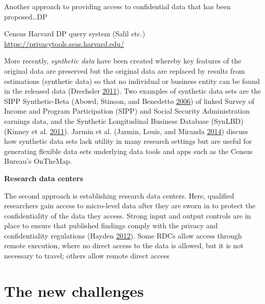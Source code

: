 \documentclass[]{krantz}
\begin{document}
Another approach to providing access to confidential data that has been
proposed\ldots{}DP

Census Harvard DP query system (Salil etc.)
\url{https://privacytools.seas.harvard.edu/}

More recently, \emph{synthetic data} have been created whereby key
features of the original data are preserved but the original data are
replaced by results from estimations (synthetic data) so that no
individual or business entity can be found in the released data
(Drechsler \protect\hyperlink{ref-drechsler2011synthetic}{2011}). Two
examples of synthetic data sets are the SIPP Synthetic-Beta (Abowd,
Stinson, and Benedetto \protect\hyperlink{ref-abowd2006final}{2006}) of
linked Survey of Income and Program Participation (SIPP) and Social
Security Administration earnings data, and the Synthetic Longitudinal
Business Database (SynLBD) (Kinney et al.
\protect\hyperlink{ref-kinney2011towards}{2011}). Jarmin et al. (Jarmin,
Louis, and Miranda \protect\hyperlink{ref-jarmin2014expanding}{2014})
discuss how synthetic data sets lack utility in many research settings
but are useful for generating flexible data sets underlying data tools
and apps such as the Census Bureau's OnTheMap.

\textbf{Research data centers}

The second approach is establishing research data centers. Here,
qualified researchers gain access to micro-level data after they are
sworn in to protect the confidentiality of the data they access. Strong
input and output controls are in place to ensure that published findings
comply with the privacy and confidentiality regulations (Hayden
\protect\hyperlink{ref-hayden2012broken}{2012}). Some RDCs allow access
through remote execution, where no direct access to the data is allowed,
but it is not necessary to travel; others allow remote direct access

\section{The new challenges}\label{the-new-challenges}
\end{document}
